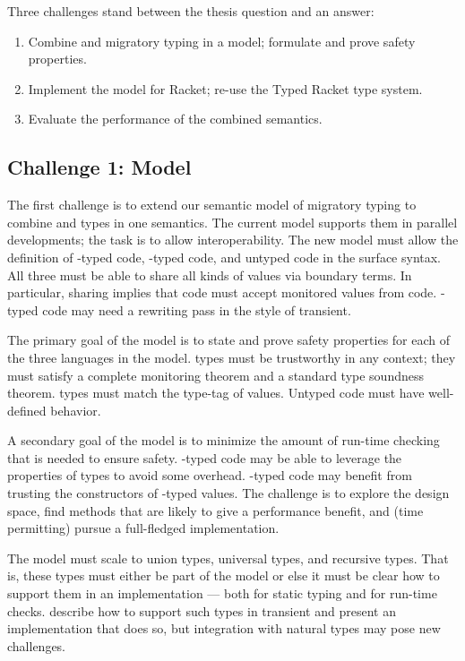 Three challenges stand between the thesis question and an answer:

\begin{enumerate}
\item Combine \tdeep{} and \tshallow{} migratory typing in a model; formulate and prove safety properties.
\item Implement the model for Racket; re-use the Typed Racket type system.
\item Evaluate the performance of the combined semantics.
\end{enumerate}

\subsection{Challenge 1: Model}

The first challenge is to extend our semantic model of migratory typing to combine
 \tdeep{} and \tshallow{} types in one semantics.
The current model supports them in parallel developments; the task is to
 allow interoperability.
The new model must allow the definition of \tdeep{}-typed code,
 \tshallow{}-typed code, and untyped code in the surface syntax.
All three must be able to share all kinds of values via boundary terms.
In particular, sharing implies that \tshallow{} code must accept monitored
 values from \tdeep{} code.
\tDeep{}-typed code may need a rewriting pass in the style of transient.
 
The primary goal of the model is to state and prove safety properties for each
 of the three languages in the model.
\tDeep{} types must be trustworthy in any context; they must satisfy a complete
 monitoring theorem and a standard type soundness theorem.
\tShallow{} types must match the type-tag of values.
Untyped code must have well-defined behavior.

A secondary goal of the model is to minimize the amount of run-time checking
 that is needed to ensure safety.
\tShallow{}-typed code may be able to leverage the properties of \tdeep{} types
 to avoid some overhead.
\tDeep{}-typed code may benefit from trusting the constructors of \tshallow{}-typed
 values.
The challenge is to explore the design space, find methods that are likely to
 give a performance benefit, and (time permitting) pursue a full-fledged implementation.

The model must scale to union types, universal types, and recursive types.
That is, these types must either be part of the model or else it must be clear
 how to support them in an implementation --- both for static typing and
 for run-time checks.
\citet{gf-icfp-2018} describe how to support such types in transient and
 present an implementation that does so, but integration with natural types
 may pose new challenges.


